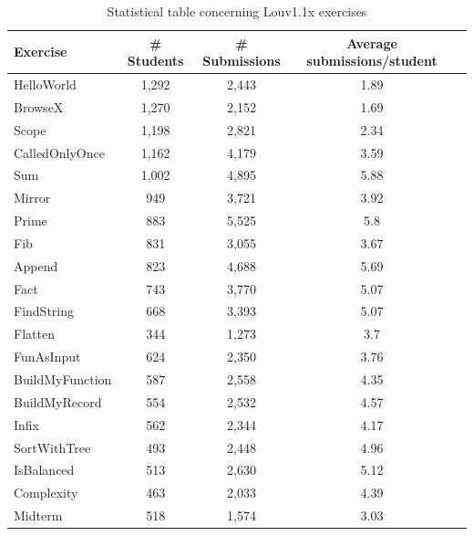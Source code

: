 \documentclass[11pt,a4paper,twoside,openright]{report}
\begin{document}
 \begin{table}[!ht]
     \small
   \begin{center}
     \begin{tabular}{lcccc}
       \toprule
       \bf{Exercise} & \bf \# Students & \bf 
 \# Submissions & \bf Average submissions/student \\
       \toprule
       \toprule
       HelloWorld & 1,292 & 2,443 & 1.89 \\
       \midrule
       BrowseX & 1,270 & 2,152 & 1.69 \\
       \midrule
       Scope & 1,198 & 2,821 & 2.34 \\
       \midrule
       CalledOnlyOnce & 1,162 & 4,179 & 3.59 \\
       \midrule
       Sum & 1,002 & 4,895 & 5.88 \\
       \midrule
       Mirror & 949 & 3,721 & 3.92 \\
       \midrule
       Prime & 883 & 5,525 & 5.8 \\
       \midrule
       Fib & 831 & 3,055 & 3.67 \\
       \midrule
       Append & 823 & 4,688 & 5.69 \\
       \midrule
       Fact & 743 & 3,770 & 5.07 \\
       \midrule
       FindString & 668 & 3,393 & 5.07 \\
       \midrule
       Flatten & 344 & 1,273 & 3.7 \\
       \midrule
       FunAsInput & 624 & 2,350 & 3.76 \\
       \midrule
       BuildMyFunction & 587 & 2,558 & 4.35 \\
       \midrule
       BuildMyRecord & 554 & 2,532 & 4.57 \\
       \midrule
       Infix & 562 & 2,344 & 4.17 \\
       \midrule
       SortWithTree & 493 & 2,448 & 4.96 \\
       \midrule
       IsBalanced & 513 & 2,630 & 5.12 \\
       \midrule
       Complexity & 463 & 2,033 & 4.39 \\
       \midrule
       Midterm & 518 & 1,574 & 3.03 \\
       \bottomrule
     \end{tabular}
   \end{center}
   \caption{Statistical table concerning Louv1.1x exercises} 
 \label{fig:sub_11x}
 \end{table}
 
\end{document}
